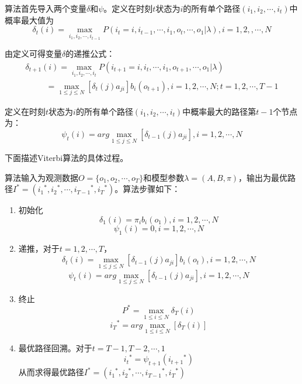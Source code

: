     算法首先导入两个变量$\delta $和$\psi $。定义在时刻$t$状态为$i$的所有单个路径$({i_1},{i_2}, \cdots ,{i_t})$中概率最大值为
        \begin{equation}
            {\delta _t}(i) = \mathop {\max }\limits_{{i_1},{i_2}, \cdots ,{i_{t - 1}}} P({i_t} = i,{i_{t - 1}}, \cdots ,{i_1},{o_t}, \cdots ,{o_1}|\lambda ),i = 1,2,, \cdots ,N
        \end{equation}

    由定义可得变量$\delta $的递推公式：
        \begin{equation}
            \begin{array}{l}
            {\delta _{t + 1}}(i) = \mathop {\max }\limits_{{i_1},{i_2}, \cdots ,{i_t}} P({i_{t + 1}} = i,{i_t}, \cdots ,{i_1},{o_{t + 1}}, \cdots ,{o_1}|\lambda )\\
            \;\;\;\;\;\;\;\;\; = \mathop {\max }\limits_{1 \le j \le N} \left[ {{\delta _t}(j){a_{ji}}} \right]{b_i}({o_{t + 1}}),i = 1,2, \cdots ,N;t = 1,2, \cdots,T - 1
        \end{array}
        \end{equation}

    定义在时刻$t$状态为$i$的所有单个路径$({i_1},{i_2}, \cdots ,{i_t})$中概率最大的路径第$t-1$个节点为：
         \begin{equation}
            {\psi _t}(i) = arg\mathop {\max }\limits_{1 \le j \le N} [{\delta _{t - 1}}(j){a_{ji}}],i = 1,2, \cdots, N
        \end{equation}

    下面描述Viterbi算法的具体过程。

    算法输入为观测数据$O = \{ {o_1},{o_2}, \cdots ,{o_T}\}$和模型参数$\lambda  = \left( {A,B,\pi } \right)$，输出为最优路径${I^*} = ({i_1}^*,{i_2}^*, \cdots ,{i_{T - 1}}^*,{i_T}^*)$。算法步骤如下：
    \begin{enumerate}
        \item 初始化
            \[{\delta _1}(i) = {\pi _i}{b_i}({o_1}),i = 1,2, \cdots ,N\]
            \[{\psi _1}(i) = 0,i = 1,2, \cdots ,N\]
        \item 递推，对于$t = 1,2, \cdots,T$，
            \[{\delta _t}(i) = \mathop {\max }\limits_{1 \le j \le N} \left[ {{\delta _{t - 1}}(j){a_{ji}}} \right]{b_i}({o_t}),i = 1,2, \cdots ,N\]
            \[{\psi _t}(i) = arg\mathop {\max }\limits_{1 \le j \le N} [{\delta _{t - 1}}(j){a_{ji}}],i = 1,2, \cdots ,N\]
        \item 终止
             \[{P^*} = \mathop {\max }\limits_{1 \le i \le N} {\delta _T}(i)\]
             \[{i_T}^* = arg\mathop {\max }\limits_{1 \le i \le N} \left[ {{\delta _T}(i)} \right]\]
        \item 最优路径回溯。对于$t = T-1,T-2, \cdots,1$
            \[{i_t}^* = {\psi _{t + 1}}({i_{t + 1}}^*)\]
            从而求得最优路径${I^*} = ({i_1}^*,{i_2}^*, \cdots ,{i_{T - 1}}^*,{i_T}^*)$
    \end{enumerate}



